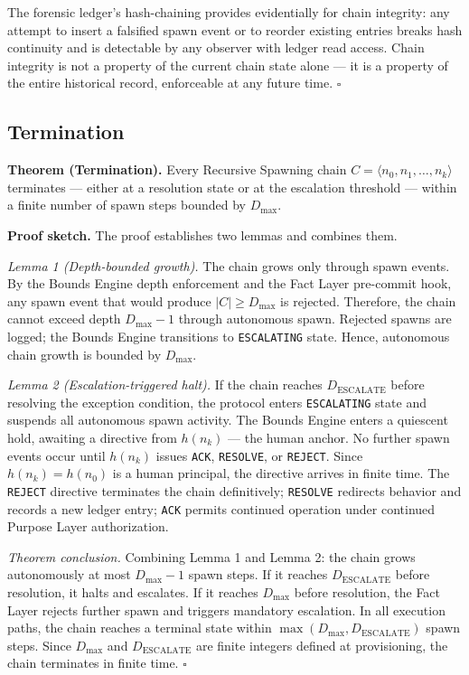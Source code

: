 \medskip
The forensic ledger's hash-chaining provides evidentially for chain integrity: any attempt to insert a falsified spawn event or to reorder existing entries breaks hash continuity and is detectable by any observer with ledger read access. Chain integrity is not a property of the current chain state alone --- it is a property of the entire historical record, enforceable at any future time. $\square$

\subsection{Termination}
\label{sec:rs-termination}

\medskip
\noindent\textbf{Theorem (Termination).} Every Recursive Spawning chain $C = \langle n_0, n_1, \ldots, n_k \rangle$ terminates --- either at a resolution state or at the escalation threshold --- within a finite number of spawn steps bounded by $D_{\text{max}}$.

\medskip
\noindent\textbf{Proof sketch.} The proof establishes two lemmas and combines them.

\medskip
\textit{Lemma 1 (Depth-bounded growth).} The chain grows only through spawn events. By the Bounds Engine depth enforcement and the Fact Layer pre-commit hook, any spawn event that would produce $|C| \geq D_{\text{max}}$ is rejected. Therefore, the chain cannot exceed depth $D_{\text{max}} - 1$ through autonomous spawn. Rejected spawns are logged; the Bounds Engine transitions to \texttt{ESCALATING} state. Hence, autonomous chain growth is bounded by $D_{\text{max}}$.

\medskip
\textit{Lemma 2 (Escalation-triggered halt).} If the chain reaches $D_{\text{ESCALATE}}$ before resolving the exception condition, the protocol enters \texttt{ESCALATING} state and suspends all autonomous spawn activity. The Bounds Engine enters a quiescent hold, awaiting a directive from $h(n_k)$ --- the human anchor. No further spawn events occur until $h(n_k)$ issues \texttt{ACK}, \texttt{RESOLVE}, or \texttt{REJECT}. Since $h(n_k) = h(n_0)$ is a human principal, the directive arrives in finite time. The \texttt{REJECT} directive terminates the chain definitively; \texttt{RESOLVE} redirects behavior and records a new ledger entry; \texttt{ACK} permits continued operation under continued Purpose Layer authorization.

\medskip
\textit{Theorem conclusion.} Combining Lemma 1 and Lemma 2: the chain grows autonomously at most $D_{\text{max}} - 1$ spawn steps. If it reaches $D_{\text{ESCALATE}}$ before resolution, it halts and escalates. If it reaches $D_{\text{max}}$ before resolution, the Fact Layer rejects further spawn and triggers mandatory escalation. In all execution paths, the chain reaches a terminal state within $\max(D_{\text{max}}, D_{\text{ESCALATE}})$ spawn steps. Since $D_{\text{max}}$ and $D_{\text{ESCALATE}}$ are finite integers defined at provisioning, the chain terminates in finite time. $\square$

